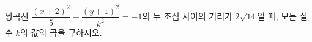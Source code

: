 쌍곡선 $\dfrac{(x+2)^2}{5}-\dfrac{(y+1)^2}{k^2}=-1$의 두 초점 사이의 거리가 $2\sqrt{14}$일 때, 모든 실수 $k$의 값의 곱을 구하시오.

